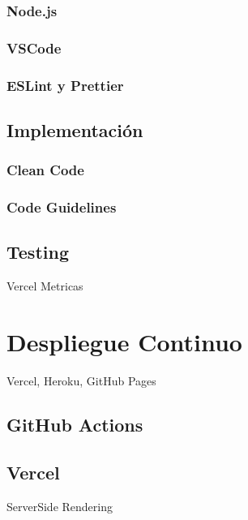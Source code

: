 \documentclass[12pt,twoside,titlepage]{report}
\begin{document}
\subsubsection{Node.js}

\subsubsection{VSCode}

\subsubsection{ESLint y Prettier}

\subsection{Implementación}

\subsubsection{Clean Code}

\subsubsection{Code Guidelines}

\subsection{Testing}

Vercel Metricas

\section{Despliegue Continuo}

Vercel, Heroku, GitHub Pages

\subsection{GitHub Actions}

\subsection{Vercel}

ServerSide Rendering


\newpage

\end{document}
